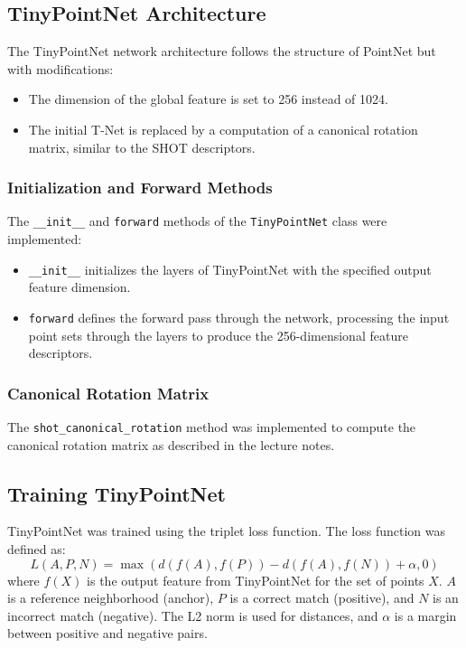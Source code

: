 \documentclass{article}
\begin{document}
\subsection{TinyPointNet Architecture}
The TinyPointNet network architecture follows the structure of PointNet but with modifications:
\begin{itemize}
    \item The dimension of the global feature is set to 256 instead of 1024.
    \item The initial T-Net is replaced by a computation of a canonical rotation matrix, similar to the SHOT descriptors.
\end{itemize}

\subsubsection{Initialization and Forward Methods}
The \texttt{\_\_init\_\_} and \texttt{forward} methods of the \texttt{TinyPointNet} class were implemented:
\begin{itemize}
    \item \texttt{\_\_init\_\_} initializes the layers of TinyPointNet with the specified output feature dimension.
    \item \texttt{forward} defines the forward pass through the network, processing the input point sets through the layers to produce the 256-dimensional feature descriptors.
\end{itemize}

\subsubsection{Canonical Rotation Matrix}
The \texttt{shot\_canonical\_rotation} method was implemented to compute the canonical rotation matrix as described in the lecture notes.

\subsection{Training TinyPointNet}
TinyPointNet was trained using the triplet loss function. The loss function was defined as:
\[
L(A, P, N) = \max(d(f(A), f(P)) - d(f(A), f(N)) + \alpha, 0)
\]
where \( f(X) \) is the output feature from TinyPointNet for the set of points \( X \). \( A \) is a reference neighborhood (anchor), \( P \) is a correct match (positive), and \( N \) is an incorrect match (negative). The L2 norm is used for distances, and \( \alpha \) is a margin between positive and negative pairs.
\end{document}
